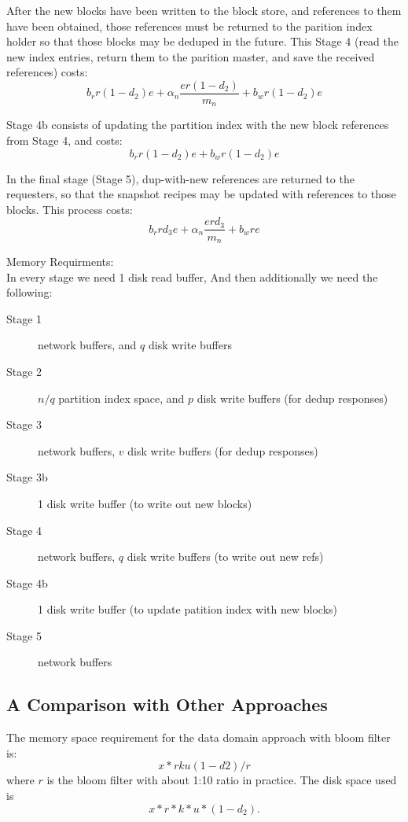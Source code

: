 After the new blocks have been written to the block store, and references to
them have been obtained, those references must be returned to the parition
index holder so that those blocks may be deduped in the future. This Stage 4 (read the new index entries, return them to the parition master, and save the received references) costs:
\[
    b_r r (1-d_2)e + \alpha_n\frac{e r(1-d_2)}{m_n} + b_w r(1-d_2)e
\]

Stage 4b consists of updating the partition index with the new block references
from Stage 4, and costs:
\[
    b_r r (1-d_2)e + b_w r(1-d_2)e
\]

In the final stage (Stage 5), dup-with-new references are returned to the
requesters, so that the snapshot recipes may be updated with references to
those blocks. This process costs:
\[
    b_r r d_3 e + \alpha_n\frac{e r d_3}{m_n} + b_w r e
\]

Memory Requirments:\\
In every stage we need 1 disk read buffer, And then additionally we need the following:
\begin{description}
    \item[Stage 1] network buffers, and $q$ disk write buffers
    \item[Stage 2] $n/q$ partition index space, and $p$ disk write buffers (for dedup responses)
    \item[Stage 3] network buffers, $v$ disk write buffers (for dedup responses)
    \item[Stage 3b] 1 disk write buffer (to write out new blocks)
    \item[Stage 4] network buffers, $q$ disk write buffers (to write out new refs)
    \item[Stage 4b] 1 disk write buffer (to update patition index with new blocks)
    \item[Stage 5] network buffers
\end{description}




\subsection{A Comparison with Other Approaches}

The memory  space requirement for the data domain approach with bloom filter is:
\[
x*r k u (1-d2)/r
\]
where $r$ is the bloom filter with about  1:10 ratio in practice.  The disk space used  is 
\[
x*r *k *u*(1-d_2).
\]


